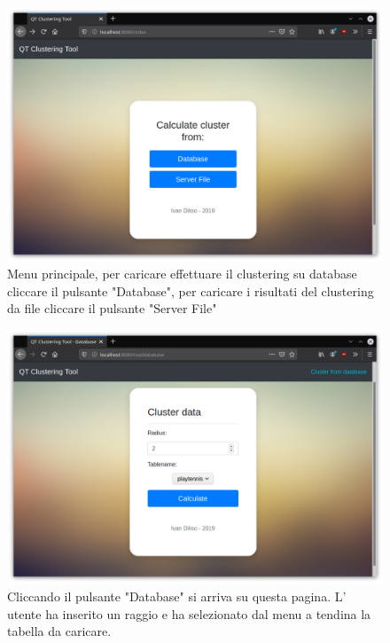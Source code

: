 \documentclass{article}
\begin{document}
    \begin{figure}[H]
        \includegraphics[scale=0.4]{ADDON1}
        \caption{Menu principale, per caricare effettuare il clustering su 
        database cliccare il pulsante "Database", per caricare i risultati del
        clustering da file cliccare il pulsante "Server File"}   
        \label{fig:5}
    \end{figure} 
    \begin{figure}[H]
        \includegraphics[scale=0.4]{ADDON2}
        \caption{Cliccando il pulsante "Database" si arriva su questa pagina. L'
        utente ha inserito un raggio e ha selezionato dal menu a tendina 
        la tabella da caricare. }   
        \label{fig:6}
    \end{figure} 
\end{document}

